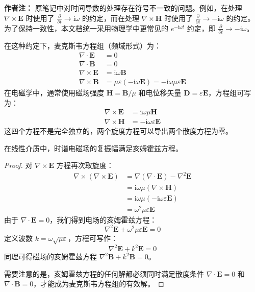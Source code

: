 \documentclass[fontset=none]{ctexart}
\begin{document}
\textbf{作者注：} 原笔记中对时间导数的处理存在符号不一致的问题。例如，在处理 $\nabla \times \bm{E}$ 时使用了 $\frac{\partial}{\partial t} \to \mathrm{i}\omega$ 的约定，而在处理 $\nabla \times \bm{H}$ 时使用了 $\frac{\partial}{\partial t} \to -\mathrm{i}\omega$ 的约定。为了保持一致性，本文档统一采用物理学中更常见的 $e^{-\mathrm{i}\omega t}$ 约定，即 $\frac{\partial}{\partial t} \to -\mathrm{i}\omega$。

在这种约定下，麦克斯韦方程组（频域形式）为：
\begin{equation}
\begin{aligned}
\nabla \cdot \bm{E} &= 0 \\
\nabla \cdot \bm{B} &= 0 \\
\nabla \times \bm{E} &= \mathrm{i}\omega \bm{B} \\
\nabla \times \bm{B} &= \mu\varepsilon(-\mathrm{i}\omega \bm{E}) = -\mathrm{i}\omega\mu\varepsilon\bm{E}
\end{aligned}
\end{equation}
在电磁学中，通常使用磁场强度 $\bm{H} = \bm{B}/\mu$ 和电位移矢量 $\bm{D} = \varepsilon\bm{E}$，方程组可写为：
\begin{equation}
\begin{aligned}
\nabla \times \bm{E} &= \mathrm{i}\omega\mu\bm{H} \\
\nabla \times \bm{H} &= -\mathrm{i}\omega\varepsilon\bm{E}
\end{aligned}
\end{equation}
这四个方程不是完全独立的，两个旋度方程可以导出两个散度方程为零。

\begin{proposition}[亥姆霍兹方程]
在线性介质中，时谐电磁场的复振幅满足亥姆霍兹方程。
\end{proposition}
\begin{proof}
对 $\nabla \times \bm{E}$ 方程再次取旋度：
\begin{equation}
\begin{aligned}
\nabla \times (\nabla \times \bm{E}) &= \nabla(\nabla \cdot \bm{E}) - \nabla^2 \bm{E} \\
&= \mathrm{i}\omega\mu (\nabla \times \bm{H}) \\
&= \mathrm{i}\omega\mu (-\mathrm{i}\omega\varepsilon\bm{E}) \\
&= \omega^2\mu\varepsilon\bm{E}
\end{aligned}
\end{equation}
由于 $\nabla \cdot \bm{E} = 0$，我们得到电场的亥姆霍兹方程：
\begin{equation}
\nabla^2 \bm{E} + \omega^2\mu\varepsilon \bm{E} = 0
\end{equation}
定义波数 $k = \omega\sqrt{\mu\varepsilon}$，方程可写作：
\begin{equation}
\nabla^2 \bm{E} + k^2 \bm{E} = 0
\end{equation}
同理可得磁场的亥姆霍兹方程 $\nabla^2 \bm{B} + k^2 \bm{B} = 0$。

需要注意的是，亥姆霍兹方程的任何解都必须同时满足散度条件 $\nabla \cdot \bm{E} = 0$ 和 $\nabla \cdot \bm{B} = 0$，才能成为麦克斯韦方程组的有效解。
\end{proof}
\end{document}

